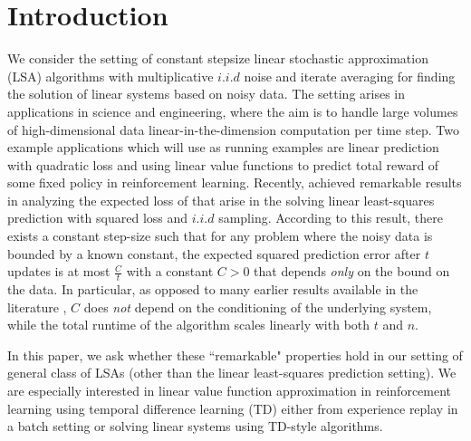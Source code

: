 \section{Introduction}
We consider the setting of constant stepsize linear stochastic approximation (LSA) algorithms with multiplicative $i.i.d$ noise and iterate averaging for finding the solution of linear systems based on noisy data. 
The setting arises in applications in science and engineering, where the aim is to handle large volumes of high-dimensional data linear-in-the-dimension computation per time step. Two example applications which will use
as running examples are linear prediction with quadratic loss and using linear value functions to predict total reward 
of some fixed policy in reinforcement learning. 
Recently, \citet{bachharder} achieved remarkable results in analyzing the expected loss of 
that arise in the solving linear least-squares prediction with squared loss and $i.i.d$ sampling.
According to this result, there exists a constant step-size such that for any problem where the noisy data is bounded by a known constant, the expected squared prediction error after $t$ updates is at most $\frac{C}{t}$ with a constant $C>0$ that depends \emph{only} on the bound on the data.  
In particular, as opposed to many earlier results available in the literature , $C$ does \emph{not} depend on the conditioning of the underlying system, while the total runtime of the algorithm scales linearly with both $t$ and $n$. 

In this paper, we ask whether these ``remarkable" properties hold in our setting of general class of LSAs (other than the linear least-squares prediction setting). We are especially interested in linear value function approximation in reinforcement learning using temporal difference learning (TD) either from experience replay in a batch setting or solving linear systems using TD-style algorithms.  


